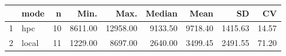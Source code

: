 \begin{table}[ht]
\centering
\begin{tabular}{rlrrrrrrr}
  \hline
 & mode & n & Min. & Max. & Median & Mean & SD & CV \\ 
  \hline
1 & hpc &  10 & 8611.00 & 12958.00 & 9133.50 & 9718.40 & 1415.63 & 14.57 \\ 
  2 & local &  11 & 1229.00 & 8697.00 & 2640.00 & 3499.45 & 2491.55 & 71.20 \\ 
   \hline
\end{tabular}
\end{table}
